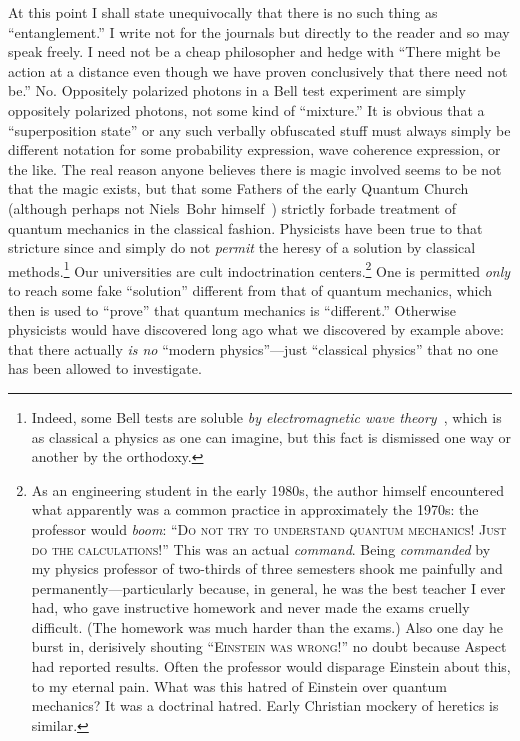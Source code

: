 \documentclass[9pt,technote]{IEEEtran}
\begin{document}
At this point I shall state unequivocally that there is no such thing
as ``entanglement.'' I write not for the journals but directly to the
reader and so may speak freely. I need not be a cheap philosopher and
hedge with ``There might be action at a distance even though we have
proven conclusively that there need not be.'' No. Oppositely polarized
photons in a Bell test experiment are simply oppositely polarized
photons, not some kind of ``mixture.'' It is obvious that a
``superposition state'' or any such verbally obfuscated stuff must
always simply be different notation for some probability expression,
wave coherence expression, or the like. The real reason anyone
believes there is magic involved seems to be not that the magic
exists, but that some Fathers of the early Quantum Church (although
perhaps not Niels~Bohr himself~\cite{enwiki:1174555777}) strictly
forbade treatment of quantum mechanics in the classical
fashion. Physicists have been true to that stricture since and simply
do not {\em{permit}} the heresy of a solution by classical
methods.\footnote{Indeed, some Bell tests are soluble {\em{by
      electromagnetic wave theory}}~\cite{kracklauer:nonloc-or-geom},
  which is as classical a physics as one can imagine, but this fact is
  dismissed one way or another by the orthodoxy.} Our universities are
cult indoctrination centers.\footnote{As an engineering student in the
  early 1980s, the author himself encountered what apparently was a
  common practice in approximately the 1970s: the professor would
  {\em{boom}}: ``{\scshape{Do not try to understand quantum mechanics!
      Just do the calculations!}}'' This was an actual
  {\em{command}}. Being {\em{commanded}} by my physics professor of
  two-thirds of three semesters shook me painfully and
  permanently---particularly because, in general, he was the best
  teacher I ever had, who gave instructive homework and never made the
  exams cruelly difficult. (The homework was much harder than the
  exams.) Also one day he burst in, derisively shouting
  ``{\scshape{Einstein was wrong!}}'' no doubt because Aspect had
  reported results. Often the professor would disparage Einstein about
  this, to my eternal pain. What was this hatred of Einstein over
  quantum mechanics? It was a doctrinal hatred. Early Christian
  mockery of heretics is similar.} One is permitted {\em{only}} to
reach some fake ``solution'' different from that of quantum mechanics,
which then is used to ``prove'' that quantum mechanics is
``different.''  Otherwise physicists would have discovered long ago
what we discovered by example above: that there actually {\em{is no}}
``modern physics''---just ``classical physics'' that no one has been
allowed to investigate.
\end{document}
